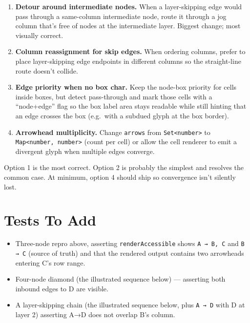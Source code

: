 \begin{enumerate}
\def\labelenumi{\arabic{enumi}.}
\tightlist
\item
  \textbf{Detour around intermediate nodes.} When a layer-skipping edge would pass through a same-column intermediate node, route it through a jog column that's free of nodes at the intermediate layer. Biggest change; most visually correct.
\item
  \textbf{Column reassignment for skip edges.} When ordering columns, prefer to place layer-skipping edge endpoints in different columns so the straight-line route doesn't collide.
\item
  \textbf{Edge priority when no box char.} Keep the node-box priority for cells inside boxes, but detect pass-through and mark those cells with a ``node+edge'' flag so the box label area stays readable while still hinting that an edge crosses the box (e.g.~with a subdued glyph at the box border).
\item
  \textbf{Arrowhead multiplicity.} Change \texttt{a\allowbreak{}r\allowbreak{}r\allowbreak{}o\allowbreak{}w\allowbreak{}s} from \texttt{S\allowbreak{}e\allowbreak{}t\allowbreak{}<\allowbreak{}n\allowbreak{}u\allowbreak{}m\allowbreak{}b\allowbreak{}e\allowbreak{}r\allowbreak{}>} to \texttt{M\allowbreak{}a\allowbreak{}p\allowbreak{}<\allowbreak{}n\allowbreak{}u\allowbreak{}m\allowbreak{}b\allowbreak{}e\allowbreak{}r\allowbreak{},\allowbreak{} \allowbreak{}n\allowbreak{}u\allowbreak{}m\allowbreak{}b\allowbreak{}e\allowbreak{}r\allowbreak{}>} (count per cell) or allow the cell renderer to emit a divergent glyph when multiple edges converge.
\end{enumerate}

Option 1 is the most correct. Option 2 is probably the simplest and resolves the common case. At minimum, option 4 should ship so convergence isn't silently lost.

\section{Tests To Add}\label{record-289-tests-to-add}

\begin{itemize}
\tightlist
\item
  Three-node repro above, asserting \texttt{r\allowbreak{}e\allowbreak{}n\allowbreak{}d\allowbreak{}e\allowbreak{}r\allowbreak{}A\allowbreak{}c\allowbreak{}c\allowbreak{}e\allowbreak{}s\allowbreak{}s\allowbreak{}i\allowbreak{}b\allowbreak{}l\allowbreak{}e} shows \texttt{A\allowbreak{} \allowbreak{}→\allowbreak{} \allowbreak{}B\allowbreak{},\allowbreak{} \allowbreak{}C} and \texttt{B\allowbreak{} \allowbreak{}→\allowbreak{} \allowbreak{}C} (source of truth) and that the rendered output contains two arrowheads entering C's row range.
\item
  Four-node diamond (the illustrated sequence below) --- asserting both inbound edges to D are visible.
\item
  A layer-skipping chain (the illustrated sequence below, plus \texttt{A\allowbreak{} \allowbreak{}→\allowbreak{} \allowbreak{}D} with D at layer 2) asserting A→D does not overlap B's column.
\end{itemize}

